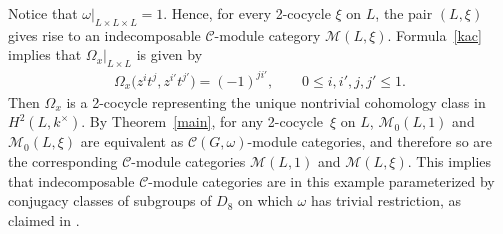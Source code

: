 \documentclass[11pt]{article}
\numberwithin{equation}{section}
\newcommand{\cch}{\Omega}
\newcommand{\C}{{\mathcal C}}
\newcommand{\M}{{\mathcal M}}
\newcommand{\1}{\textbf{1}}
\begin{document}
\begin{Example}
Notice that $\omega\vert_{L \times L\times L} = 1$. Hence, for every 2-cocycle $\xi$ on $L$, the pair $(L, \xi)$ gives rise to an indecomposable $\C$-module category $\M(L, \xi)$.
Formula~\eqref{kac} implies that $\cch_x\vert_{L \times L}$ is given by
\begin{gather*}\cch_x\big(z^{i}t^{j}, z^{i'}t^{j'}\big) = (-1)^{ji'}, \qquad 0\leq i, i', j, j' \leq 1.\end{gather*}
Then $\cch_x$ is a 2-cocycle representing the unique nontrivial cohomology class in $H^2(L, k^\times)$. By Theorem~\ref{main}, for any 2-cocycle~$\xi$ on $L$, $\M_0(L, 1)$ and $\M_0(L, \xi)$ are equivalent as $\C(G, \omega)$-module categories, and therefore so are the corresponding $\C$-module categories $\M(L, 1)$ and $\M(L, \xi)$. This implies that indecomposable $\C$-module categories are in this example parameterized by conjugacy classes of subgroups of $D_8$ on which $\omega$ has trivial restriction, as claimed in \cite[Section~6.4]{MN}.
\end{Example}
\end{document}
